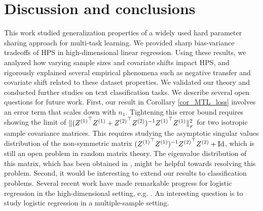 \section{Discussion and conclusions}\label{sec_conclude}

This work studied generalization properties of a widely used hard parameter sharing approach for multi-task learning.
We provided sharp bias-variance tradeoffs of HPS in high-dimensional linear regression.
Using these results, we analyzed how varying sample sizes and covariate shifts impact HPS, and rigorously explained several empirical phenomena such as negative transfer and covariate shift related to these dataset properties.
We validated our theory and conducted further studies on text classification tasks.
We describe several open questions for future work.
First, our result in Corollary \ref{cor_MTL_loss} involves an error term that scales down with $n_1$.
Tightening this error bound requires showing the limit of $\|({Z^{(1)}}^{\top} Z^{(1)} + {Z^{(2)}}^{\top} Z^{(2)})^{-1} {Z^{(1)}}^{\top} Z^{(1)}\|_{_{F}}^2$ for two isotropic sample covariance matrices.
This requires studying the asymptotic singular values distribution of the non-symmetric matrix $({Z^{(1)}}^{\top} Z^{(1)})^{-1}{Z^{(2)}}^{\top} Z^{(2)}+\operatorname{Id}$, which is still an open problem in random matrix theory.
The eigenvalue distribution of this matrix, which has been obtained in \cite{Fmatrix}, might be helpful towards resolving this problem.
Second, it would be interesting to extend our results to classification problems.
Several recent work have made remarkable progress for logistic regression in the high-dimensional setting, e.g. \cite{sur2019modern}.
An interesting question is to study logistic regression in a multiple-sample setting.


